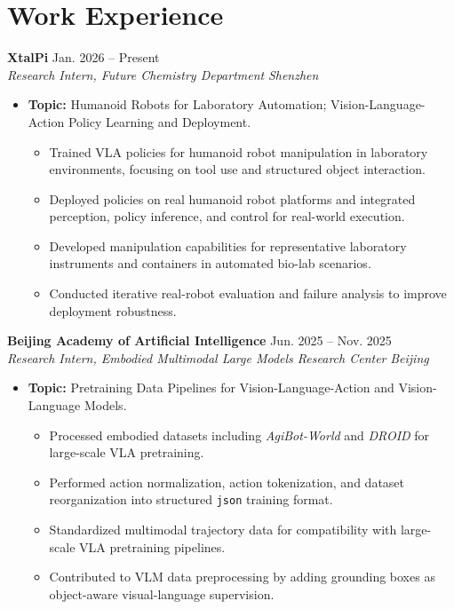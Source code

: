 \documentclass[10pt,a4paper]{article}
\newcommand{\entry}[4]{%
  \textbf{#1} \hfill #2\\
  \textit{#3} \hfill \textit{#4}\\[-0.35em]
}
\newcommand{\cvitem}[1]{\item \small #1}
\begin{document}
\section*{Work Experience}
\entry{XtalPi}{Jan. 2026 -- Present}{Research Intern, Future Chemistry Department}{Shenzhen}
\begin{itemize}[leftmargin=1.2em, topsep=0.2em, itemsep=0.18em]
  \cvitem{\textbf{Topic:} Humanoid Robots for Laboratory Automation; Vision-Language-Action Policy Learning and Deployment.}
  \begin{itemize}[leftmargin=1.4em, topsep=0.15em, itemsep=0.12em]
    \item Trained VLA policies for humanoid robot manipulation in laboratory environments, focusing on tool use and structured object interaction.
    \item Deployed policies on real humanoid robot platforms and integrated perception, policy inference, and control for real-world execution.
    \item Developed manipulation capabilities for representative laboratory instruments and containers in automated bio-lab scenarios.
    \item Conducted iterative real-robot evaluation and failure analysis to improve deployment robustness.
  \end{itemize}
\end{itemize}

\entry{Beijing Academy of Artificial Intelligence}{Jun. 2025 -- Nov. 2025}{Research Intern, Embodied Multimodal Large Models Research Center}{Beijing}
\begin{itemize}[leftmargin=1.2em, topsep=0.2em, itemsep=0.18em]
  \cvitem{\textbf{Topic:} Pretraining Data Pipelines for Vision-Language-Action and Vision-Language Models.}
  \begin{itemize}[leftmargin=1.4em, topsep=0.15em, itemsep=0.12em]
    \item Processed embodied datasets including \textit{AgiBot-World} and \textit{DROID} for large-scale VLA pretraining.
    \item Performed action normalization, action tokenization, and dataset reorganization into structured \texttt{json} training format.
    \item Standardized multimodal trajectory data for compatibility with large-scale VLA pretraining pipelines.
    \item Contributed to VLM data preprocessing by adding grounding boxes as object-aware visual-language supervision.
  \end{itemize}
\end{itemize}
\end{document}
